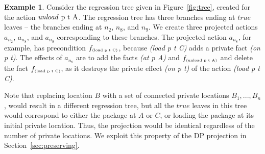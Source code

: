 \documentclass[letterpaper]{article}
\newcommand{\delete}{\textit{delete}}
\newcommand{\true}{\textit{true}}
\newcommand{\load}{\textit{load}}
\newcommand{\unload}{\textit{unload}}
\theoremstyle{definition}
\newtheorem{example}{Example}[section]
\begin{document}
\begin{example}
\label{ex2}
Consider the regression tree given in Figure~\ref{fig:tree}, created for the action $\mbox{\unload\ p t A}$. The regression tree has three branches ending at $\true$ leaves -- the branches ending at $n_2$, $n_8$, and $n_9$. We create three projected actions $a_{n_2}$, $a_{n_8}$, and $a_{n_9}$ corresponding to these branches.
The projected action $a_{n_8}$, for example, has precondition {\em $f_{\tiny\mbox{(load p t C)}}$}, because {\em (load p t C)} adds a private fact {\em (on p t)}. The effects of $a_{n_8}$ are to add the facts {\em (at p A)} and $f_{\tiny\mbox{(unload p t A)}}$ and delete the fact $f_{\tiny\mbox{(load p t C)}}$, as it destroys the private effect {\em (on p t)} of the action {\em (load p t C)}.




Note that replacing location $B$ with a set of connected private locations $B_1,...,B_n$, would result in a different regression tree, but all the $\true$ leaves in this tree would correspond to either the package at $A$ or $C$, or loading the package at its initial private location. Thus, the projection would be identical regardless of the number of private locations. We exploit this property of the DP projection in Section~\ref{sec:preserving}. %
\end{example}

\end{document}
